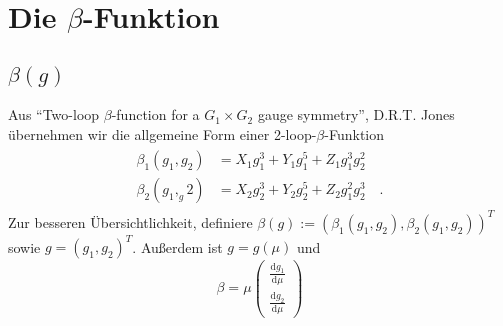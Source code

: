 \documentclass{article}
\newcommand{\twopartdef}[2]
{
	\left(
		\begin{array}{ll}
			#1  \\
			#2 
		\end{array}
	\right)
}
\renewcommand{\d}{\text{d}}
\begin{document}
\tableofcontents

\clearpage
\section{Die $\beta$-Funktion}

  \subsection{$\beta(g)$}
      
	Aus ``Two-loop $\beta$-function for a $G_1\times G_2$ gauge symmetry'', D.R.T. Jones übernehmen 
	wir die allgemeine Form einer 2-loop-$\beta$-Funktion
	\begin{align}
	      \begin{aligned}
	      \beta_1(g_1,g_2)&=X_1 g_1^3+ Y_1 g_1^5+ Z_1g_1^3g_2^2\\
	      \beta_2(g_1,_g2)&=X_2 g_2^3+Y_2 g_2^5+ Z_2 g_1^2 g_2^3 \quad. 
	      \end{aligned} \label{beta(g)}
	\end{align}
	Zur besseren Übersichtlichkeit, definiere $\beta(g):=(\beta_1(g_1,g_2),\beta_2(g_1,g_2))^T$ sowie $g=(g_1,g_2)^T$.
	Außerdem ist $g=g(\mu)$ und
	\begin{equation}
	\beta=\mu \twopartdef {\frac{\d g_1}{\d \mu}} {\frac{\d g_2}{\d \mu}} 
	\end{equation}

    
\end{document}
